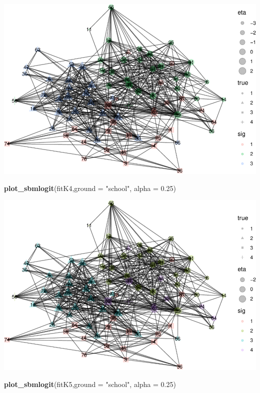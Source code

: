 \documentclass[]{article}
\newenvironment{Shaded}{\begin{snugshade}}{\end{snugshade}}
\newcommand{\DataTypeTok}[1]{\textcolor[rgb]{0.13,0.29,0.53}{#1}}
\newcommand{\FloatTok}[1]{\textcolor[rgb]{0.00,0.00,0.81}{#1}}
\newcommand{\KeywordTok}[1]{\textcolor[rgb]{0.13,0.29,0.53}{\textbf{#1}}}
\newcommand{\NormalTok}[1]{#1}
\newcommand{\StringTok}[1]{\textcolor[rgb]{0.31,0.60,0.02}{#1}}
\begin{document}
\includegraphics{karate_test_files/figure-latex/unnamed-chunk-19-1.pdf}

\begin{Shaded}
\begin{Highlighting}[]
\KeywordTok{plot_sbmlogit}\NormalTok{(fitK4,}\DataTypeTok{ground =} \StringTok{"school"}\NormalTok{, }\DataTypeTok{alpha =} \FloatTok{0.25}\NormalTok{)}
\end{Highlighting}
\end{Shaded}

\includegraphics{karate_test_files/figure-latex/unnamed-chunk-20-1.pdf}

\begin{Shaded}
\begin{Highlighting}[]
\KeywordTok{plot_sbmlogit}\NormalTok{(fitK5,}\DataTypeTok{ground =} \StringTok{"school"}\NormalTok{, }\DataTypeTok{alpha =} \FloatTok{0.25}\NormalTok{)}
\end{Highlighting}
\end{Shaded}
\end{document}

